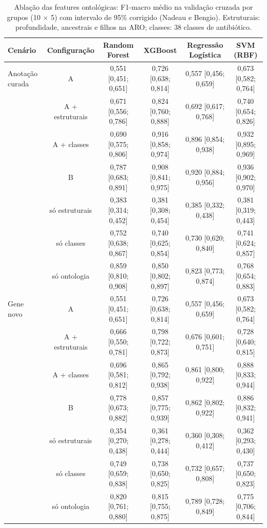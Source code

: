\begin{table}[htbp]
  \centering
  \caption{Ablação das features ontológicas: F1-macro médio na validação cruzada por grupos (10 $\times$ 5) com intervalo de 95\% corrigido (Nadeau e Bengio). Estruturais: profundidade, ancestrais e filhos na ARO; classes: 38 classes de antibiótico.}
  \label{tab:ablacao}
  \begin{tabular}{lccccc}
    \toprule
    Cenário & Configuração & Random Forest & XGBoost & Regressão Logística & SVM (RBF) \\
    \midrule
    Anotação curada & A & 0,551 [0,451; 0,651] & 0,726 [0,638; 0,814] & 0,557 [0,456; 0,659] & 0,673 [0,582; 0,764] \\
     & A + estruturais & 0,671 [0,556; 0,786] & 0,824 [0,760; 0,888] & 0,692 [0,617; 0,768] & 0,740 [0,654; 0,826] \\
     & A + classes & 0,690 [0,575; 0,806] & 0,916 [0,858; 0,974] & 0,896 [0,854; 0,938] & 0,932 [0,895; 0,969] \\
     & B & 0,787 [0,683; 0,891] & 0,908 [0,841; 0,975] & 0,920 [0,884; 0,956] & 0,936 [0,902; 0,970] \\
     & só estruturais & 0,383 [0,314; 0,452] & 0,381 [0,308; 0,454] & 0,385 [0,332; 0,438] & 0,381 [0,319; 0,443] \\
     & só classes & 0,752 [0,638; 0,867] & 0,740 [0,625; 0,854] & 0,730 [0,620; 0,840] & 0,741 [0,624; 0,857] \\
     & só ontologia & 0,859 [0,810; 0,908] & 0,850 [0,802; 0,897] & 0,823 [0,773; 0,874] & 0,768 [0,654; 0,883] \\
    Gene novo & A & 0,551 [0,451; 0,651] & 0,726 [0,638; 0,814] & 0,557 [0,456; 0,659] & 0,673 [0,582; 0,764] \\
     & A + estruturais & 0,666 [0,550; 0,781] & 0,798 [0,722; 0,873] & 0,676 [0,601; 0,751] & 0,728 [0,640; 0,815] \\
     & A + classes & 0,696 [0,581; 0,812] & 0,865 [0,792; 0,938] & 0,861 [0,800; 0,922] & 0,888 [0,833; 0,944] \\
     & B & 0,778 [0,673; 0,882] & 0,857 [0,775; 0,939] & 0,862 [0,802; 0,922] & 0,886 [0,832; 0,941] \\
     & só estruturais & 0,354 [0,270; 0,438] & 0,361 [0,278; 0,444] & 0,360 [0,308; 0,412] & 0,362 [0,293; 0,430] \\
     & só classes & 0,749 [0,659; 0,838] & 0,738 [0,650; 0,825] & 0,732 [0,657; 0,808] & 0,737 [0,650; 0,823] \\
     & só ontologia & 0,820 [0,761; 0,880] & 0,815 [0,755; 0,875] & 0,789 [0,728; 0,849] & 0,775 [0,706; 0,844] \\
    \bottomrule
  \end{tabular}
\end{table}
